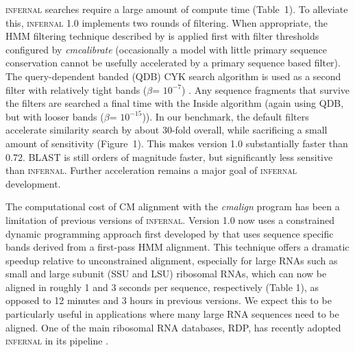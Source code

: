 \textsc{infernal} searches require a large amount of compute time
(Table~1). To alleviate this, \textsc{infernal} 1.0 implements two
rounds of filtering.  When appropriate, the HMM filtering technique
described by \citet{WeinbergRuzzo06} is applied
first with filter thresholds configured by \emph{cmcalibrate}
(occasionally a model with little primary sequence conservation cannot
be usefully accelerated by a primary sequence based filter).  The
query-dependent banded (QDB) CYK search algorithm is used as a second
filter with relatively tight bands ($\beta$= $10^{-7}$)
\citep{NawrockiEddy07}.  Any sequence fragments that survive the filters are
searched a final time with the Inside algorithm (again using QDB, but with looser
bands ($\beta$= $10^{-15}$)).
In our benchmark, the default filters accelerate similarity search by
about 30-fold overall, while sacrificing a small amount of sensitivity
(Figure~1). This makes version 1.0 substantially faster than
0.72. \textsc{BLAST} is still orders of magnitude faster, but
significantly less sensitive than \textsc{infernal}. Further
acceleration remains a major goal of \textsc{infernal} development.

The computational cost of CM alignment with the \emph{cmalign} program
has been a limitation of previous versions of
\textsc{infernal}. Version 1.0 now uses a constrained dynamic
programming approach first developed by \citet{Brown00}
that uses sequence specific bands derived from a first-pass HMM
alignment. This technique offers a dramatic speedup relative to
unconstrained alignment, especially for large RNAs such as small and
large subunit (SSU and LSU) ribosomal RNAs, which can now be aligned
in roughly 1 and 3 seconds per sequence, respectively (Table 1), as
opposed to 12 minutes and 3 hours in previous versions.
We expect this to be particularly useful in applications where
many large RNA sequences need to be aligned. One of the main ribosomal
RNA databases, RDP, has recently adopted \textsc{infernal} in its
pipeline \citep{Cole09}.

